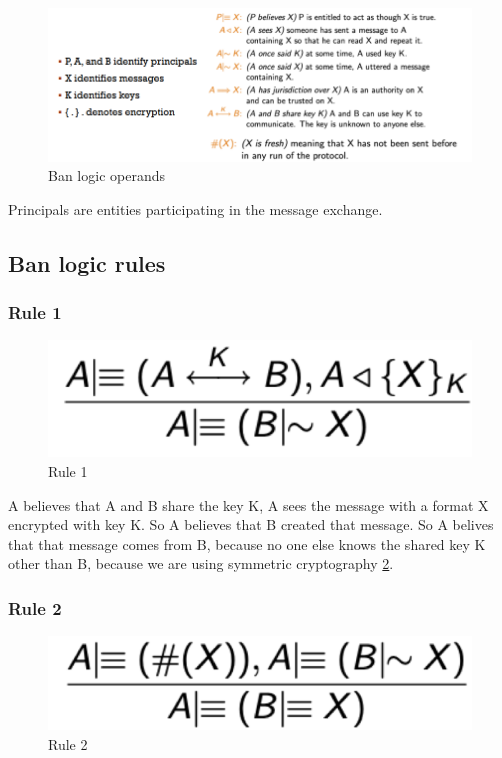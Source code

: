 \begin{figure}
	\centering
	\includegraphics[width=0.7\linewidth]{Images/Chapter4/ban_logic}
	\caption{Ban logic operands}
	\label{fig:banlogic}
\end{figure}

Principals are entities participating in the message exchange.

\subsection{Ban logic rules}

\subsubsection{Rule 1}
\begin{figure}
	\centering
	\includegraphics[width=0.3\linewidth]{Images/Chapter4/ban_logic_rule1}
	\caption{Rule 1}
	\label{fig:banlogicrule1}
\end{figure}

A believes that A and B share the key K, A sees the message with a format X encrypted with key K. So A believes that B created that message. So A belives that that message comes from B, because no one else knows the shared key K other than B, because we are using symmetric cryptography \ref{fig:banlogicrule1}.

\subsubsection{Rule 2}

\begin{figure}
	\centering
	\includegraphics[width=0.3\linewidth]{Images/Chapter4/ban_logic_rule2}
	\caption{Rule 2}
	\label{fig:banlogicrule2}
\end{figure}

